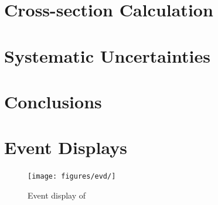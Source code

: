 \documentclass[letterpaper,12pt]{article}
\begin{document}
\section{Cross-section Calculation}

\section{Systematic Uncertainties}

\section{Conclusions}

\appendix
\section{Event Displays}

\begin{figure}[!hbtp]
  \begin{center}
    \texttt{[image: figures/evd/]}
    \caption{%
                Event display of 
            }
    \label{fig:evd_alkdsg}
  \end{center}
\end{figure}



\end{document}

